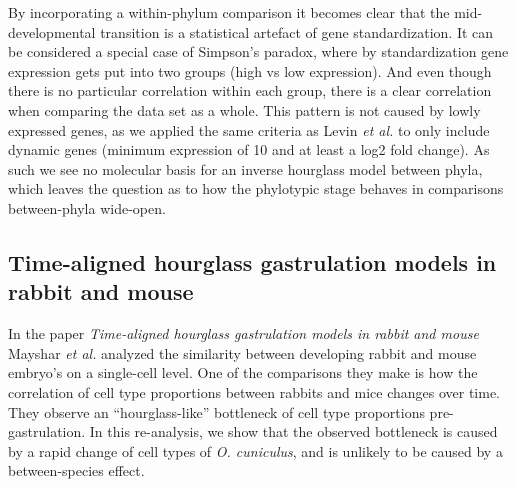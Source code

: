 By incorporating a within-phylum comparison it becomes clear that the mid-developmental transition is a statistical artefact of gene standardization. It can be considered a special case of Simpson's paradox, where by standardization gene expression gets put into two groups (high vs low expression). And even though there is no particular correlation within each group, there is a clear correlation when comparing the data set as a whole\cite{Saccenti2023}. This pattern is not caused by lowly expressed genes, as we applied the same criteria as Levin \textit{et al.} to only include dynamic genes (minimum expression of 10 and at least a log2 fold change). As such we see no molecular basis for an inverse hourglass model between phyla, which leaves the question as to how the phylotypic stage behaves in comparisons between-phyla wide-open.

\subsection{Time-aligned hourglass gastrulation models in rabbit and mouse} \label{subsection:mayshar}

In the paper \textit{Time-aligned hourglass gastrulation models in rabbit and mouse}\cite{Mayshar2023} Mayshar \textit{et al.} analyzed the similarity between developing rabbit and mouse embryo's on a single-cell level. One of the comparisons they make is how the correlation of cell type proportions between rabbits and mice changes over time. They observe an ``hourglass-like'' bottleneck of cell type proportions pre-gastrulation. In this re-analysis, we show that the observed bottleneck is caused by a rapid change of cell types of \textit{O. cuniculus}, and is unlikely to be caused by a between-species effect.

